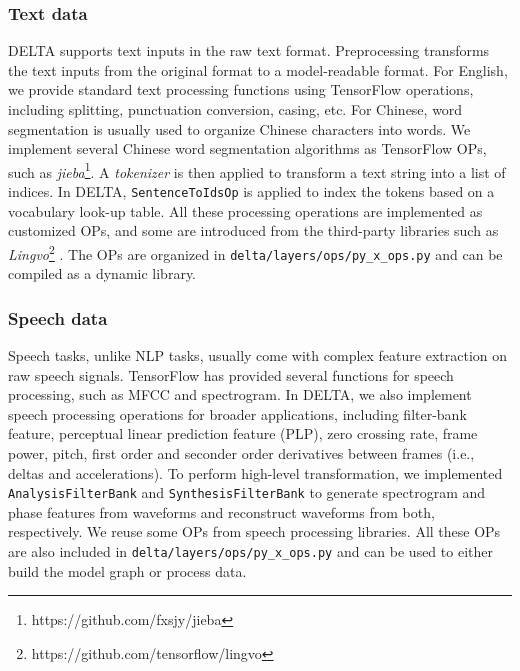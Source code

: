 \documentclass{article}
\begin{document}
\subsubsection{Text data}

DELTA supports text inputs in the raw text format. Preprocessing transforms the text inputs from the original format to a model-readable format. For English, we provide standard text processing functions using TensorFlow operations, including splitting, punctuation conversion, casing, etc. For Chinese, word segmentation is usually used to organize Chinese characters into words. We implement several Chinese word segmentation algorithms as TensorFlow OPs, such as \textit{jieba}\footnote{https://github.com/fxsjy/jieba}. A \textit{tokenizer} is then applied to transform a text string into a list of indices. In DELTA, \texttt{SentenceToIdsOp} is applied to index the tokens based on a vocabulary look-up table. All these processing operations are implemented as customized OPs, and some are introduced from the third-party libraries such as \textit{Lingvo}\footnote{https://github.com/tensorflow/lingvo} \citep{shen2019lingvo}. The OPs are organized in \texttt{delta/layers/ops/py_x_ops.py} and can be compiled as a dynamic library.


\subsubsection{Speech data}

Speech tasks, unlike NLP tasks, usually come with complex feature extraction on raw speech signals. TensorFlow has provided several functions for speech processing, such as MFCC and spectrogram. In DELTA, we also implement speech processing operations for broader applications, including filter-bank feature, perceptual linear prediction feature (PLP), zero crossing rate, frame power, pitch, first order and seconder order derivatives between frames (i.e., deltas and accelerations). To perform high-level transformation, we implemented \texttt{AnalysisFilterBank} and \texttt{SynthesisFilterBank} to generate spectrogram and phase features from waveforms and reconstruct waveforms from both, respectively. We reuse some OPs from speech processing libraries. All these OPs are also included in \texttt{delta/layers/ops/py_x_ops.py} and can be used to either build the model graph or process data.
\end{document}
